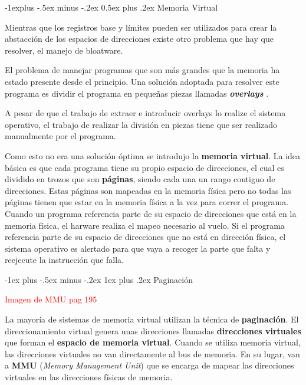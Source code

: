 \documentclass[10pt,portrait, twocolumn]{article}
\makeatletter
\renewcommand{\subsection}{\@startsection{subsection}{2}{0mm}%
                                {-1explus -.5ex minus -.2ex}%
                                {0.5ex plus .2ex}%
                                {\normalfont\normalsize\bfseries}}
\renewcommand{\subsubsection}{\@startsection{subsubsection}{3}{0mm}%
                                {-1ex plus -.5ex minus -.2ex}%
                                {1ex plus .2ex}%
                                {\normalfont\small\bfseries}}
\makeatother
\begin{document}
\subsection{Memoria Virtual}

Mientras que los registros base y límites pueden ser utilizados para crear la abstacción de los espacios de direcciones existe otro problema que hay que resolver, el manejo de bloatware.

	\quad El problema de manejar programas que son más grandes que la memoria ha estado presente desde el principio. Una solución adoptada para resolver este programa es dividir el programa en pequeñas piezas llamadas \textbf{\textit{overlays} }.
	
	\quad A pesar de que el trabajo de extraer e introducir overlays lo realize el sistema operativo, el trabajo de realizar la división en piezas tiene que ser realizado manualmente por el programa.
	
	
	\quad Como esto no era una solución óptima se introdujo la \textbf{memoria virtual}. La idea básica es que cada programa tiene su propio espacio de direcciones, el cual es dividido en trozos que son \textbf{páginas}, siendo cada una un rango contiguo de direcciones. Estas páginas son mapeadas en la memoria física pero no todas las páginas tienen que estar en la memoria física a la vez para correr el programa. Cuando un programa referencia parte de su espacio de direcciones que está en la memoria física, el harware realiza el mapeo necesario al vuelo. Si el programa referencia parte de su espacio de direcciones que no está en dirección física, el sistema operativo es alertado para que vaya a recoger la parte que falta y reejecute la instrucción que falla.


\subsubsection{Paginación}

\textcolor{red}{Imagen de MMU pag 195}

La mayoría de sistemas de memoria virtual utilizan la técnica de \textbf{paginación}. El direccionamiento virtual genera unas direcciones llamadas \textbf{direcciones virtuales} que forman el \textbf{espacio de memoria virtual}. Cuando se utiliza memoria virtual, las direcciones virtuales no van directamente al bus de memoria. En su lugar, van a \textbf{MMU} (\textit{Memory Management Unit}) que se encarga de mapear las direcciones virtuales en las direcciones físicas de memoria.
\end{document}
